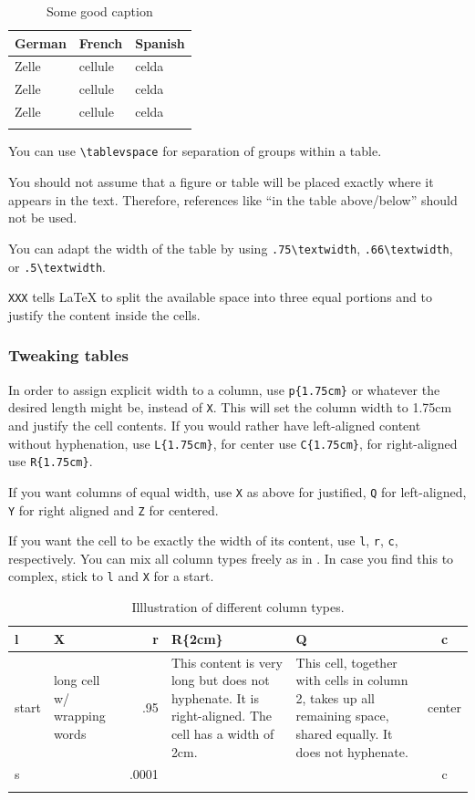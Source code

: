 \begin{table}[h]
  \begin{tabularx}{\textwidth}{XXX}
    \lsptoprule
    German  & French  & Spanish \\
    \midrule
    Zelle   & cellule & celda    \\
    Zelle   & cellule & celda    \\
    Zelle   & cellule & celda    \\
    \lspbottomrule
  \end{tabularx}
  \caption{Some good caption}
  \label{tab:chapterhandle:keytotable}
\end{table}

You can use \verb+\tablevspace+ for separation of groups within a table. 

You should not assume that a figure or table will be placed exactly where it appears in the text. Therefore, references like ``in the table above/below'' should not be used. 

You can adapt the width of the table by using \verb+.75\textwidth+,  \verb+.66\textwidth+, or \verb+.5\textwidth+.

\verb+XXX+ tells \LaTeX\xspace to split the available space into three equal portions and to justify the content inside the cells. 

\subsubsection{Tweaking tables}
In order to assign explicit width to a column, use \verb+p{1.75cm}+ or whatever the desired length might be, instead of \verb+X+. 
This will set the column width to 1.75cm and justify the cell contents. If you would rather have left-aligned content without hyphenation, use \verb+L{1.75cm}+, for center use \verb+C{1.75cm}+, for right-aligned use \verb+R{1.75cm}+.

If you want columns of equal width, use \verb+X+ as above for justified, \verb+Q+ for left-aligned, \verb+Y+ for right aligned and \verb+Z+ for centered.

If you want the cell to be exactly the width of its content, use \verb+l+, \verb+r+, \verb+c+, respectively. You can mix all column types freely as in . In case you find this to complex, stick to \verb+l+ and \verb+X+ for a start.

\begin{table}
 \begin{tabularx}{\textwidth}{lXrR{2cm}Qc}
\lsptoprule
l & X & r & R\{2cm\} & Q & c \\
\midrule
  start & long cell w/   wrapping words & .95 & This content is very long but does not hyphenate. It is right-aligned. The cell has a width of 2cm. & This cell, together with cells in column 2, takes up all remaining space, shared equally. It does not hyphenate. & center\\
s & & .0001 & &&  c \\ 
\lspbottomrule
\end{tabularx} 
\caption{Illlustration of different column types.}
\label{tab:colmixes}
\end{table}


